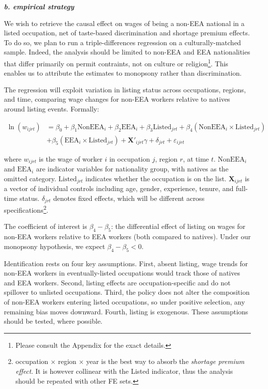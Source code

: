 \documentclass[10pt, a4paper]{article}
\begin{document}
\textbf{\textit{b. empirical strategy}}

We wish to retrieve the causal effect on wages of being a non-EEA national 
in a listed occupation, net of taste-based discrimination and shortage premium effects. To do so, we plan to run a triple-differences regression on a culturally-matched sample. Indeed, the analysis should be limited to non-EEA and EEA nationalities that differ primarily on permit contraints, not on culture or religion\footnote{Please consult the Appendix for the exact details.}. This enables us to attribute the estimates to monopsony rather than discrimination.  


The regression will exploit variation in listing status across occupations, regions, and time, comparing wage changes for non-EEA workers relative to natives around listing events. Formally:

\begin{align*}
    \ln(w_{ijrt}) &= \beta_0 + \beta_1 \text{NonEEA}_i + \beta_2 \text{EEA}_i 
    + \beta_3 \text{Listed}_{jrt} 
    + \beta_4 (\text{NonEEA}_i \times \text{Listed}_{jrt}) \\
    &+ \beta_5 (\text{EEA}_i \times \text{Listed}_{jrt}) 
    + \mathbf{X}'_{ijrt} \gamma + \delta_{jrt} + \varepsilon_{ijrt}
    \label{eq:baseline}
\end{align*}

where $w_{ijrt}$ is the wage of worker $i$ in occupation $j$, region $r$, 
at time $t$. $\text{NonEEA}_i$ and $\text{EEA}_i$ are indicator variables 
for nationality group, with natives as the omitted category. 
$\text{Listed}_{jrt}$ indicates whether the occupation is on the list. $\mathbf{X}_{ijrt}$ is a vector of individual controls including age, gender, experience, tenure, and full-time status. $\delta_{jrt}$ denotes fixed effects, which will be different across specifications\footnote{occupation × region × year is the best way to absorb the \textit{shortage premium effect}. It is however collinear with the Listed indicator, thus the analysis should be repeated with other FE sets.}.

The coefficient of interest is $\beta_4 - \beta_5$: the differential 
effect of listing on wages for non-EEA workers relative to EEA workers 
(both compared to natives). Under our monopsony hypothesis, we expect 
$\beta_4 - \beta_5 < 0$. 

Identification rests on four key assumptions. First, absent listing, wage trends for non-EEA workers in eventually-listed occupations would track those of natives and EEA workers. Second, listing effects are occupation-specific and do not spillover to unlisted occupations. Third, the policy does not alter the composition of non-EEA workers entering listed occupations, so under positive selection, any remaining bias moves downward. Fourth, listing is exogenous. These assumptions should be tested, where possible.
\end{document}
